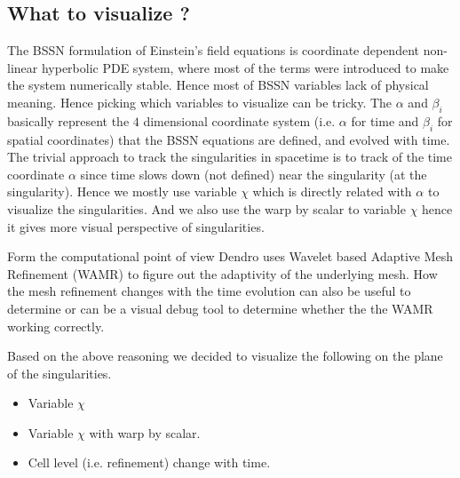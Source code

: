 \subsection{What to visualize ?}
The BSSN formulation of Einstein's field equations is coordinate dependent non-linear hyperbolic PDE system, where most of the terms were introduced to make the system numerically stable. Hence most of BSSN variables lack of physical meaning. Hence picking which variables to visualize can be tricky. The $\alpha$ and $\beta_i$ basically represent the $4$ dimensional coordinate system (i.e. $\alpha$ for time and $\beta_i$ for spatial coordinates) that the BSSN equations are defined, and evolved with time. The trivial approach to track the singularities in spacetime is to track of the time coordinate $\alpha$ since time slows down (not defined) near the singularity (at the singularity). Hence we mostly use variable $\chi$ which is directly related with $\alpha$ to visualize the singularities. And we also use the warp by scalar to variable $\chi$ hence it gives more visual perspective of singularities. 

\par Form the computational point of view Dendro uses Wavelet based Adaptive Mesh Refinement (WAMR) to figure out the adaptivity of the underlying mesh. How the mesh refinement changes with the time evolution can also be useful to determine or can be a visual debug tool to determine whether the the WAMR working correctly. 

Based on the above reasoning we decided to visualize the following on the plane of the singularities. 

\begin{itemize}
\item Variable $\chi$  
\item Variable $\chi$ with warp by scalar. 
\item Cell level (i.e. refinement) change with time.
\end{itemize}
